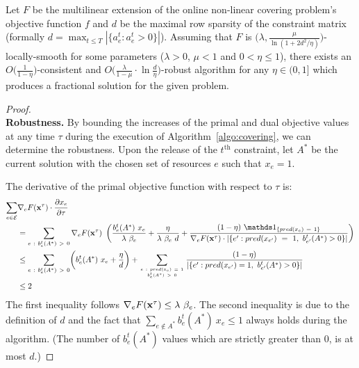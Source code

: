 \setcounter{theorem}{0}
\begin{theorem} \label{thm:covering-formal}
	Let $F$ be the multilinear extension of the online non-linear covering problem's objective function $f$ and
	$d$ be the maximal row sparsity of the constraint matrix (formally $d = \max_{t \le T} |\{a^{t}_{e}: a^{t}_{e} > 0\}|$).
	Assuming that $F$ is $\bigl(\lambda, \frac{\mu}{\ln(1+2d^{2}/\eta)}\bigr)$-locally-smooth
	for some parameters ($\lambda > 0$, $\mu < 1$ and $0 < \eta \leq 1$), there exists an $O\bigl( \frac{1}{1 - \eta} \bigr)$-consistent and $O\bigl( \frac{\lambda}{1 - \mu}  \cdot \ln \frac{d}{\eta} \bigr)$-robust algorithm for any $\eta \in (0,1]$ which produces a fractional solution for the given problem.
\end{theorem}
\begin{proof} \\
\textbf{Robustness.}
By bounding the increases of the primal and dual objective values at any time $\tau$ during the execution of
Algorithm~\ref{algo:covering}, we can determine the robustness. Upon the release of the $t^{\text{th}}$ constraint,
let $A^{*}$ be the current solution with the chosen set of resources $e$ such that $x_{e} = 1$.

\noindent The derivative of the primal objective function with respect to $\tau$ is:
%
\begin{align}	\label{eq:covering-primal}
\sum_{e \in \mathcal{E}} & \nabla_{e} F(\vect{x}^{\tau}) \cdot \frac{\partial x_{e}}{ \partial \tau} \notag \\
&= \sum_{e\ :\ b^{t}_{e}(A^{*})\ >\ 0} \nabla_{e} F(\vect{x}^{\tau})
	\ \left( \frac{b^{t}_{e}(A^{*}) \ x_{e}}{\lambda\ \beta_{e}} + \frac{\eta}{\lambda\ \beta_{e}\ d}
		 + \frac{(1 - \eta) \ \one_{\{pred(x_{e})\ =\ 1\}}}{\nabla_{e} F(\vect{x}^{\tau}) \cdot |\{e': pred(x_{e'})\ =\ 1,\ b^{t}_{e'}(A^{*}) > 0\}| }
 \right)	\notag \\
%
&\leq  \sum_{e\ :\ b^{t}_{e}(A^{*})\ >\ 0} \biggl( b^{t}_{e}(A^{*}) \ x_{e} + \frac{\eta}{d} \biggr)
	+ \sum_{e\ :\ pred(x_e)\ =\ 1 \atop b^{t}_{e}(A^{*})\ >\ 0} \frac{(1 - \eta)}{ |\{e': pred(x_{e'}) = 1,\ b^{t}_{e'}(A^{*}) > 0\}|  } \notag \\
& \leq 2
\end{align}
The first inequality follows $\nabla_{e} F(\mathbf{x}^{\tau}) \leq \lambda \  \beta_{e}$. The second inequality is
due to the definition of $d$ and  the fact that
$\sum_{e \notin A^{*}} b^{t}_{e}(A^{*}) \ x_{e} \leq 1$ always holds during the algorithm. (The number of $b^{t}_{e}(A^{*})$ values which are strictly greater than 0, is at most $d$.)


\end{proof}
